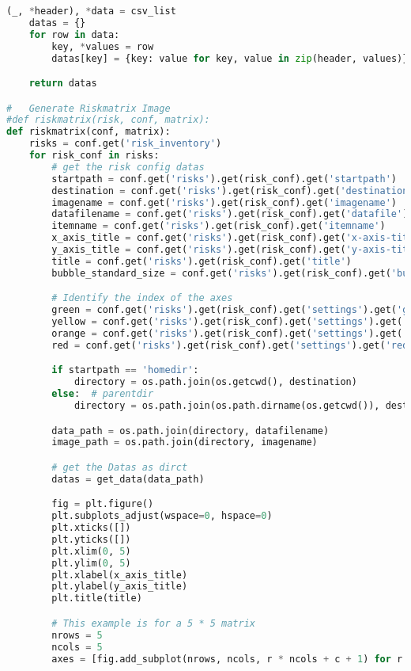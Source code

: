 \begin{lstlisting}[language=python, caption=Python LaTex - riskmatrix.py - Risxikomatrizen,captionpos=b,label={lst:riskmatrix},breaklines=true]
    (_, *header), *data = csv_list
    datas = {}
    for row in data:
        key, *values = row
        datas[key] = {key: value for key, value in zip(header, values)}

    return datas

#   Generate Riskmatrix Image
#def riskmatrix(risk, conf, matrix):
def riskmatrix(conf, matrix):
    risks = conf.get('risk_inventory')
    for risk_conf in risks:
        # get the risk config datas
        startpath = conf.get('risks').get(risk_conf).get('startpath')
        destination = conf.get('risks').get(risk_conf).get('destination_path')
        imagename = conf.get('risks').get(risk_conf).get('imagename')
        datafilename = conf.get('risks').get(risk_conf).get('datafile')
        itemname = conf.get('risks').get(risk_conf).get('itemname')
        x_axis_title = conf.get('risks').get(risk_conf).get('x-axis-title')
        y_axis_title = conf.get('risks').get(risk_conf).get('y-axis-title')
        title = conf.get('risks').get(risk_conf).get('title')
        bubble_standard_size = conf.get('risks').get(risk_conf).get('bubble-standard-size')

        # Identify the index of the axes
        green = conf.get('risks').get(risk_conf).get('settings').get('green-boxes')
        yellow = conf.get('risks').get(risk_conf).get('settings').get('yellow-boxes')
        orange = conf.get('risks').get(risk_conf).get('settings').get('orange-boxes')
        red = conf.get('risks').get(risk_conf).get('settings').get('red-boxes')

        if startpath == 'homedir':
            directory = os.path.join(os.getcwd(), destination)
        else:  # parentdir
            directory = os.path.join(os.path.dirname(os.getcwd()), destination)

        data_path = os.path.join(directory, datafilename)
        image_path = os.path.join(directory, imagename)

        # get the Datas as dirct
        datas = get_data(data_path)

        fig = plt.figure()
        plt.subplots_adjust(wspace=0, hspace=0)
        plt.xticks([])
        plt.yticks([])
        plt.xlim(0, 5)
        plt.ylim(0, 5)
        plt.xlabel(x_axis_title)
        plt.ylabel(y_axis_title)
        plt.title(title)

        # This example is for a 5 * 5 matrix
        nrows = 5
        ncols = 5
        axes = [fig.add_subplot(nrows, ncols, r * ncols + c + 1) for r in range(0, nrows) for c in range(0, ncols)]


\end{lstlisting}

